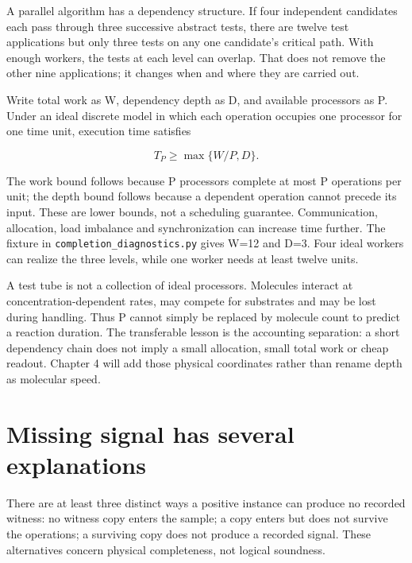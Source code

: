 A parallel algorithm has a dependency structure. If four independent
candidates each pass through three successive abstract tests, there are
twelve test applications but only three tests on any one candidate's
critical path. With enough workers, the tests at each level can overlap.
That does not remove the other nine applications; it changes when and
where they are carried out.


Write total work as W, dependency depth as D, and available processors
as P. Under an ideal discrete model in which each operation occupies one
processor for one time unit, execution time satisfies

\begin{equation}
T_P\ge\max\{W/P,D\}.
\end{equation}

The work bound follows because P processors complete at most P
operations per unit; the depth bound follows because a dependent
operation cannot precede its input. These are lower bounds, not a
scheduling guarantee. Communication, allocation, load imbalance and
synchronization can increase time further. The fixture in
\texttt{completion\_diagnostics.py} gives W=12 and D=3. Four ideal
workers can realize the three levels, while one worker needs at least
twelve units.

A test tube is not a collection of ideal processors. Molecules interact
at concentration-dependent rates, may compete for substrates and may be
lost during handling. Thus P cannot simply be replaced by molecule count
to predict a reaction duration. The transferable lesson is the
accounting separation: a short dependency chain does not imply a small
allocation, small total work or cheap readout. Chapter 4 will add those
physical coordinates rather than rename depth as molecular speed.

\section{Missing signal has several
explanations}\label{missing-signal-has-several-explanations}

There are at least three distinct ways a positive instance can produce
no recorded witness: no witness copy enters the sample; a copy enters
but does not survive the operations; a surviving copy does not produce a
recorded signal. These alternatives concern physical completeness, not
logical soundness.

